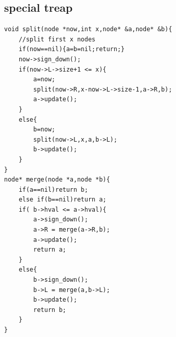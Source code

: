 \documentclass[10pt,twocolumn,oneside]{article}
\begin{document}
\subsection{special treap}
\begin{lstlisting}
void split(node *now,int x,node* &a,node* &b){
	//split first x nodes
	if(now==nil){a=b=nil;return;}
	now->sign_down();
	if(now->L->size+1 <= x){
		a=now;
		split(now->R,x-now->L->size-1,a->R,b);
		a->update();
	}
	else{
		b=now;
		split(now->L,x,a,b->L); 
		b->update();
	}
}
node* merge(node *a,node *b){
	if(a==nil)return b;
	else if(b==nil)return a;
	if( b->hval <= a->hval){
		a->sign_down();
		a->R = merge(a->R,b);
		a->update();
		return a;
	}
	else{
		b->sign_down();
		b->L = merge(a,b->L);
		b->update();
		return b;
	}
}

\end{lstlisting}
\end{document}
